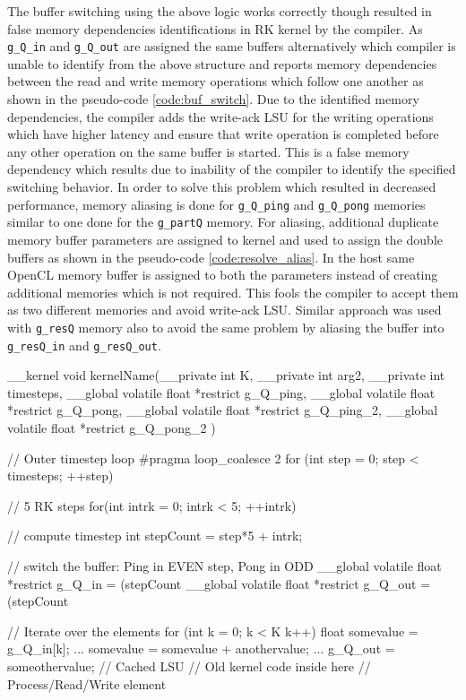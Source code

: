 The buffer switching using the above logic works correctly though resulted in false memory
dependencies identifications in RK kernel by the compiler. As \texttt{g\_Q\_in} and
\texttt{g\_Q\_out} are assigned the same buffers alternatively which compiler is unable to
identify from the above structure and reports memory dependencies between the read and write
memory operations which follow one another as shown in the pseudo-code \ref{code:buf_switch}.
Due to the identified memory dependencies, the compiler adds the write-ack LSU for the writing
operations which have higher latency and ensure that write operation is completed before
any other operation on the same buffer is started. This is a false memory dependency which
results due to inability of the compiler to identify the specified switching behavior.
In order to solve this problem which resulted in decreased performance, memory aliasing
is done for \texttt{g\_Q\_ping} and \texttt{g\_Q\_pong} memories similar to one done for the
\texttt{g\_partQ} memory. For aliasing, additional duplicate memory buffer parameters are
assigned to kernel and used to assign the double buffers as shown in the pseudo-code \ref{code:resolve_alias}.
In the host same OpenCL memory buffer is assigned to both the parameters instead of creating
additional memories which is not required. This fools the compiler to accept them as two different
memories and avoid write-ack LSU. Similar approach was used with \texttt{g\_resQ} memory also to
avoid the same problem by aliasing the buffer into \texttt{g\_resQ\_in} and \texttt{g\_resQ\_out}.

\begin{CppCode}[caption=Buffer switching for FPGA only design within the kernel, frame=tlrb, label=code:resolve_alias]
__kernel void kernelName(__private int K,
                        __private int arg2,
                        __private int timesteps,
                        __global volatile float  *restrict g_Q_ping,
                        __global volatile float  *restrict g_Q_pong,
                        __global volatile float  *restrict g_Q_ping_2,
                        __global volatile float  *restrict g_Q_pong_2
                        )
{
    // Outer timestep loop
    #pragma loop_coalesce 2
    for (int step = 0; step < timesteps; ++step)
    {
        // 5 RK steps
        for(int intrk = 0; intrk < 5; ++intrk)
        {
            // compute timestep
            int stepCount = step*5 + intrk;

            // switch the buffer: Ping in EVEN step, Pong in ODD
            __global volatile float *restrict g_Q_in = (stepCount%
            __global volatile float *restrict g_Q_out = (stepCount%

            // Iterate over the elements
            for (int k = 0; k < K k++)
            {
                float somevalue = g_Q_in[k];
                ...
                somevalue = somevalue + anothervalue;
                ...
                g_Q_out = someothervalue; // Cached LSU
            }
            // Old kernel code inside here
            // Process/Read/Write element
        }
    }
}
\end{CppCode}

